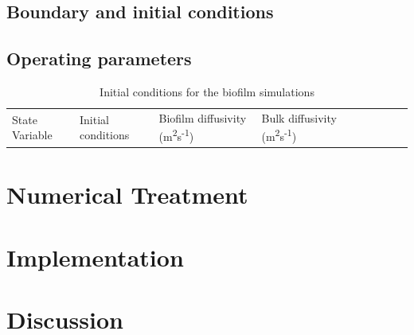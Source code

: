 

\subsection{Boundary and initial conditions}





\subsection{Operating parameters}


\begin{table}[tp]
    \centering
    \small
    \renewcommand{\arraystretch}{1.4}
    \caption{Initial conditions for the biofilm simulations}
    \tabcolsep=0.11cm
    \begin{tabular}{@{}p{3cm} p{1.4cm} p{1.5cm} p{1.7cm} p{1.4cm} p{1.4cm} p{1.4cm} p{1.4cm} p{1.4cm}@{}} \toprule
State Variable & Initial conditions & Biofilm diffusivity (m\textsuperscript{2}s\textsuperscript{-1}) & Bulk diffusivity (m\textsuperscript{2}s\textsuperscript{-1})  \\
    \end{tabular}
    \label{tab:biofilm_ics}
\end{table}
\section{Numerical Treatment}






\section{Implementation}

















\section{Discussion}

